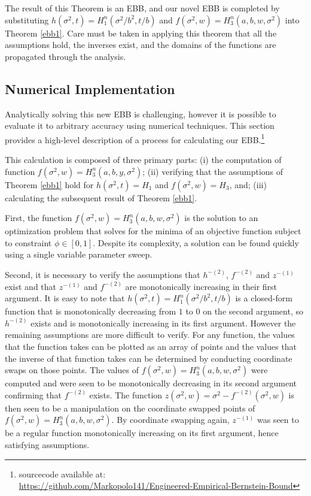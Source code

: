 \documentclass[runningheads, envcountsame, a4paper]{llncs}
\begin{document}
The result of this Theorem is an EBB, and our novel EBB is completed by substituting  $h(\sigma^2,t)=H_1^n\left(\sigma^2/b^2,t/b\right)$ and $f(\sigma^2,w)=H_3^n\left(a,b,w,\sigma^2\right)$ into Theorem \ref{ebb1}. 
Care must be taken in applying this theorem that all the assumptions hold, 
the inverses exist, and the domains of the functions are propagated through the analysis.




\subsection{Numerical Implementation}
\label{numerical-implementation}
Analytically solving this new EBB is challenging, however it is possible to evaluate it to arbitrary accuracy using numerical techniques.
This section provides a high-level description of a process for calculating our EBB.\footnote{sourcecode available at:\\\url{https://github.com/Markopolo141/Engineered-Empirical-Bernstein-Bound}}

This calculation is composed of three primary parts:
(i) the computation of function $f(\sigma^2,w)=H_3^n(a,b,y,\sigma^2)$;
(ii) verifying that the assumptions of Theorem \ref{ebb1} hold for $h(\sigma^2,t)=H_1$ and $f(\sigma^2,w)=H_3$, and;
(iii) calculating the subsequent result of Theorem \ref{ebb1}.

First, the function $f(\sigma^2,w)=H_3^n(a,b,w,\sigma^2)$ is the solution to an optimization problem that solves for the minima of an objective function subject to constraint $\phi\in[0,1]$.
Despite its complexity, a solution can be found quickly using a single variable parameter sweep.

Second, it is necessary to verify the assumptions that $h^{-(2)}$, $f^{-(2)}$ and $z^{-(1)}$ exist and that $z^{-(1)}$ and $f^{-(2)}$ are monotonically increasing in their first argument.
It is easy to note that $h(\sigma^2,t)=H_1^n\left(\sigma^2/b^2,t/b\right)$ is a closed-form function that is monotonically decreasing from $1$ to $0$ on the second argument, so $h^{-(2)}$ exists and is monotonically increasing in its first argument.  However the remaining assumptions are more difficult to verify.
For any function, the values that the function takes can be plotted as an array of points and the values that the inverse of that function takes can be determined by conducting coordinate swaps on those points.
The values of $f(\sigma^2,w)=H_3^n(a,b,w,\sigma^2)$ were computed and were seen to be monotonically decreasing in its second argument confirming that $f^{-(2)}$ exists.
The function $z(\sigma^2,w)=\sigma^2-f^{-(2)}\left(\sigma^2,w\right)$ is then seen to be a manipulation on the coordinate swapped points of $f(\sigma^2,w)=H_3^n(a,b,w,\sigma^2)$.
By coordinate swapping again, $z^{-(1)}$ was seen to be a regular function monotonically increasing on its first argument, hence satisfying assumptions.
\end{document}
